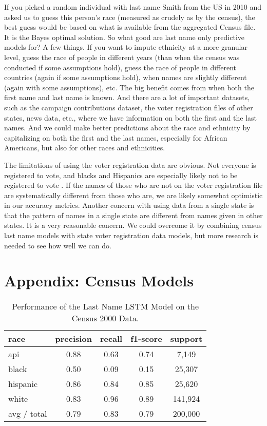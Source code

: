 \documentclass[12pt, letterpaper]{article}
\begin{document}
If you picked a random individual with last name Smith from the US in 2010 and asked us to guess this person's race (measured as crudely as by the census), the best guess would be based on what is available from the aggregated Census file. It is the Bayes optimal solution. So what good are last name only predictive models for? A few things. If you want to impute ethnicity at a more granular level, guess the race of people in different years (than when the census was conducted if some assumptions hold), guess the race of people in different countries (again if some assumptions hold), when names are slightly different (again with some assumptions), etc. The big benefit comes from when both the first name and last name is known. And there are a lot of important datasets, such as the campaign contributions dataset, the voter registration files of other states, news data, etc., where we have information on both the first and the last names. And we could make better predictions about the race and ethnicity by capitalizing on both the first and the last names, especially for African Americans, but also for other races and ethnicities.

The limitations of using the voter registration data are obvious. Not everyone is registered to vote, and blacks and Hispanics are especially likely not to be registered to vote \citep{ansolabehere2011gender}. If the names of those who are not on the voter registration file are systematically different from those who are, we are likely somewhat optimistic in our accuracy metrics. Another concern with using data from a single state is that the pattern of names in a single state are different from names given in other states. It is a very reasonable concern. We could overcome it by combining census last name models with state voter registration data models, but more research is needed to see how well we can do.

\clearpage


\clearpage
\section*{Appendix: Census Models}

\begin{table}[h!]
\centering
\caption{Performance of the Last Name LSTM Model on the Census 2000 Data.}
\begin{tabular}{ l c c c c }
\hline    
   race & precision & recall & f1-score & support\\
\hline
      api      &   0.88   &  0.63  &     0.74   & 7,149\\
      black    &   0.50   &  0.09  &     0.15   & 25,307\\
   hispanic    &   0.86   &  0.84  &     0.85   & 25,620\\
      white    &   0.83   &  0.96  &     0.89   & 141,924\\

avg / total    &   0.79   &   0.83   &   0.79 &   200,000\\
\hline
\end{tabular}
\label{table:last_name_census_2000}
\end{table}
\end{document}
